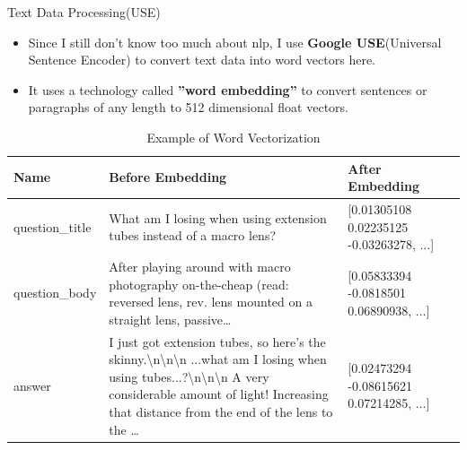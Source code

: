 \documentclass[
 size=12pt,
 paper=smartboard, %
 mode=present, %
 display=slides, %
style=tuliplab,
pauseslide,
fleqn,leqno]{powerdot}
\begin{document}
\begin{slide}{Text Data Processing(USE)}
    \begin{itemize}
        \item Since I still don't know too much about nlp, I use \textbf{Google USE}(Universal Sentence Encoder) to convert text data into word vectors here.
        \item It uses a technology called \textbf{''word embedding''} to convert sentences or paragraphs of any length to 512 dimensional float vectors.
    \end{itemize}
    \begin{table}
        \centering
        \caption{Example of Word Vectorization}
        \label{tbl:tx_vec}
        \begin{tabular}{lm{7cm}lm{7cm}}
            \hline
            Name & Before Embedding & After Embedding\\
            \hline
            question_title & What am I losing when using extension tubes instead of a macro lens?&[0.01305108  0.02235125 -0.03263278, ...]\\
            \hline
            question_body & After playing around with macro photography on-the-cheap (read: reversed lens, rev. lens mounted on a straight lens, passive\dots&[0.05833394 -0.0818501   0.06890938, ...]\\
            \hline
            answer & I just got extension tubes, so here's the skinny.\textbackslash n\textbackslash n\textbackslash n  ...what am I losing when using tubes...?\textbackslash n\textbackslash n\textbackslash n A very considerable amount of light!  Increasing that distance from the end of the lens to the \dots&[0.02473294 -0.08615621   0.07214285, ...]\\
            \hline
        \end{tabular}
    \end{table}
\end{slide}
%    
%
%    
\end{document}
